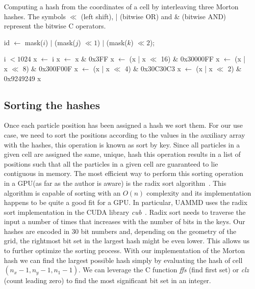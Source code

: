 \documentclass[twoside,openright,titlepage,numbers=noenddot,%
headinclude,footinclude,cleardoublepage=empty,abstract=on,
BCOR=5mm,fontsize=11pt, dvipsnames, paper=b5
]{scrreprt}
\newcommand{\uammd}{\gls{UAMMD}\xspace}
\newcommand{\gpu}{\gls{GPU}\xspace}
\begin{document}
\begin{algorithm}
  \caption[ ]{Computing a hash from the coordinates of a cell by interleaving three Morton hashes. The symbols $\ll$ (left shift), | (bitwise OR) and \& (bitwise AND) represent the bitwise C operators. } \label{alg:mortonhash}
  \begin{algorithmic}[1]
    
    \State \Return id $\gets$ mask($i$) $|$ (mask($j$)  $\ll 1$) $|$ (mask($k$) $\ll 2$);
    \EndFunction

    \Ensure i $< 1024$
    \State x $\gets$ i     
    \State x $\gets$ x \& 0x3FF
    \State x $\gets$ (x | x $\ll$  16) \& 0x30000FF
    \State x $\gets$ (x | x $\ll$  8)  \& 0x300F00F
    \State x $\gets$ (x | x $\ll$  4)  \& 0x30C30C3
    \State x $\gets$ (x | x $\ll$  2)  \& 0x9249249
    \State \Return x
    \EndFunction

  \end{algorithmic}
\end{algorithm}



\subsection*{Sorting the hashes}
Once each particle position has been assigned a hash we sort them. For our use case, we need to sort the positions according to the values in the auxiliary array with the hashes, this operation is known as sort by key. Since all particles in a given cell are assigned the same, unique, hash this operation results in a list of positions such that all the particles in a given cell are guaranteed to lie contiguous in memory.
The most efficient way to perform this sorting operation in a \gpu (as far as the author is aware) is the radix sort algorithm~\cite{Ha2009,Singh2018,Merrill2011}. This algorithm is capable of sorting with an $O(n)$ complexity and its implementation happens to be quite a good fit for a \gpu. In particular, \uammd uses the radix sort implementation in the CUDA library \emph{cub}~\cite{cub}. Radix sort needs to traverse the input a number of times that increases with the number of bits in the keys. Our hashes are encoded in $30$ bit numbers and, depending on the geometry of the grid, the rightmost bit set in the largest hash might be even lower. This allows us to further optimize the sorting process. With our implementation of the Morton hash we can find the largest possible hash simply by evaluating the hash of cell $(n_x-1, n_y-1, n_1-1)$. We can leverage the C function \emph{ffs} (find first set) or \emph{clz} (count leading zero) to find the most significant bit set in an integer.
\end{document}
